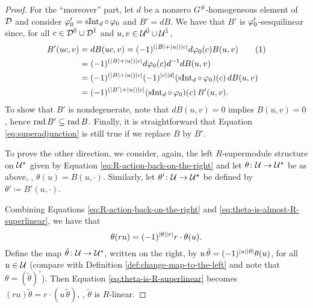 \begin{proof}
	For the ``moreover'' part, let $d$ be a nonzero $G^\#$-homogeneous element of $\mathcal{D}$ and consider $\varphi_0' = \operatorname{sInt}_d \circ \, \varphi_0$ and $B' = dB$.
	We have that $B'$ is $\varphi_0'$-sesquilinear since, for all $c\in \mathcal{D}^{\bar0} \cup \mathcal{D}^{\bar1}$ and $u,v \in \mathcal U^{\bar0} \cup \mathcal U^{\bar1}$,
	\begin{align*}
		B' (uc, v) & = dB (uc, v) = (-1)^{(|B| + |u| ) |c|} d\vphi_0(c) B(u,v) \addtocounter{equation}{1}\tag{\theequation}\label{eq:dB-is-sesquilinear} \\
		           & = (-1)^{(|B| + |u| ) |c|} d\vphi_0(c) d\inv d B(u,v)                                                                                \\
		           & =  (-1)^{(|B| + |u| ) |c|} \sign{c}{d} (\operatorname{sInt}_d \circ\, \vphi_0) (c)\, dB(u,v)                                        \\
		           & = (-1)^{(|B'| + |u|) |c|} (\operatorname{sInt}_d \circ\, \vphi_0) (c)\, B'(u,v).
	\end{align*}
	To show that $B'$ is nondegenerate, note that $dB(u,v) = 0$ implies $B(u,v) =0$, hence  $\operatorname{rad} B' \subseteq \operatorname{rad} B$.
	Finally, it is straightforward that Equation \eqref{eq:superadjunction} is still true if we replace $B$ by $B'$.


	To prove the other direction, we consider, again, the left $R$-supermodule structure on $\mathcal U^\star$ given by Equation \eqref{eq:R-action-back-on-the-right} and let $\theta\colon \mathcal U \to \mathcal U^\star$ be as above, \ie, $\theta(u) = B(u, \cdot)$. Similarly, let $\theta'\colon \mathcal U \to \mathcal U^\star$ be defined by $\theta' \coloneqq B'(u, \cdot)$.

	Combining Equations \eqref{eq:R-action-back-on-the-right} and  \eqref{eq:theta-is-almost-R-superlinear}, we have that
	\begin{equation}\label{eq:theta-is-R-superlinear}
		\theta(ru) = (-1)^{|\theta||r|} r\cdot \theta(u).
	\end{equation}
	Define the map $\tilde \theta\colon \mathcal U \to \mathcal U^\star$, written on the right, by $u\, \tilde\theta = (-1)^{|u||\theta|} \theta(u)$, for all $u\in \mathcal U$ (compare with Definition \ref{def:change-map-to-the-left} and note that $\theta = (\tilde \theta)^\circ$).
	Then Equation \eqref{eq:theta-is-R-superlinear} becomes $(ru)\tilde\theta = r \cdot (u\,\tilde\theta)$, \ie, $\tilde\theta$ is $R$-linear.


\end{proof}
